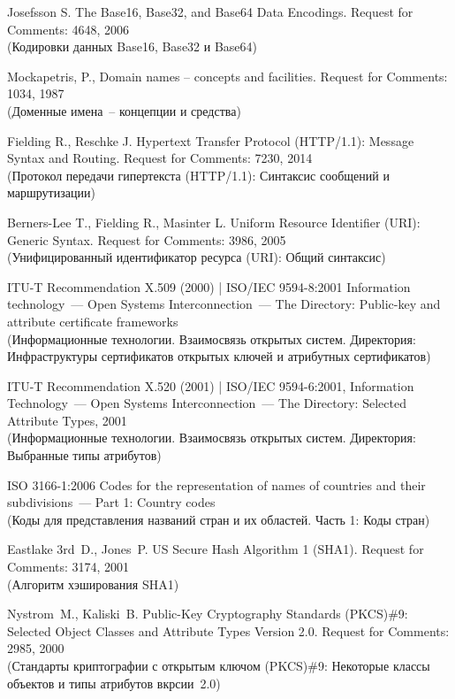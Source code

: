 \clearpage
\renewcommand{\bibname}{Библиография}
\begin{thebibliography}{9}

Josefsson S. The Base16, Base32, and Base64 Data Encodings. 
Request for Comments: 4648, 2006\\
{\small (Кодировки данных Base16, Base32 и Base64)} 

Mockapetris, P., Domain names -- concepts and facilities. 
Request for Comments: 1034, 1987\\ 
{\small (Доменные имена~-- концепции и средства)} 

Fielding R., Reschke J.
Hypertext Transfer Protocol (HTTP/1.1): Message Syntax and Routing. 
Request for Comments: 7230, 2014\\ 
{\small (Протокол передачи гипертекста (HTTP/1.1): Синтаксис сообщений и 
маршрутизации)}

Berners-Lee T., Fielding R., Masinter L. 
Uniform Resource Identifier (URI): Generic Syntax.  
Request for Comments: 3986, 2005\\
{\small (Унифицированный идентификатор ресурса (URI): Общий синтаксис)}

ITU-T Recommendation X.509 (2000) | ISO/IEC 9594-8:2001
Information technology~--- Open Systems Interconnection~--- 
The Directory: Public-key and attribute certificate frameworks\\
{\small (Информационные технологии. Взаимосвязь открытых систем.
Директория: Инфраструктуры сертификатов открытых ключей и атрибутных 
сертификатов)} 

ITU-T Recommendation X.520 (2001) | ISO/IEC 9594-6:2001,
Information Technology~--- Open Systems Interconnection~---
The Directory: Selected Attribute Types, 2001\\
{\small (Информационные технологии. Взаимосвязь открытых систем.
Директория: Выбранные типы атрибутов)}

ISO 3166-1:2006 Codes for the representation of names of countries and 
their subdivisions~--- Part 1: Country codes\\
{\small (Коды для представления названий стран и их областей. Часть 1: 
Коды стран)} 

Eastlake 3rd~D., Jones~P.
US Secure Hash Algorithm 1 (SHA1). 
Request for Comments: 3174, 2001\\   
{\small (Алгоритм хэширования SHA1)}

Nystrom~M., Kaliski~B. 
Public-Key Cryptography Standards (PKCS)\#9: 
Selected Object Classes and Attribute Types Version 2.0. Request for 
Comments: 2985, 2000\\ 
{\small (Стандарты криптографии с открытым ключом (PKCS)\#9: 
Некоторые классы объектов и типы атрибутов вкрсии~2.0)}  


\end{thebibliography}
